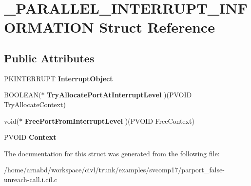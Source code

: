 \hypertarget{struct__PARALLEL__INTERRUPT__INFORMATION}{}\section{\+\_\+\+P\+A\+R\+A\+L\+L\+E\+L\+\_\+\+I\+N\+T\+E\+R\+R\+U\+P\+T\+\_\+\+I\+N\+F\+O\+R\+M\+A\+T\+I\+O\+N Struct Reference}
\label{struct__PARALLEL__INTERRUPT__INFORMATION}
\subsection*{Public Attributes}
\begin{DoxyCompactItemize}
\item 
\hypertarget{struct__PARALLEL__INTERRUPT__INFORMATION_a49384eb3eff37e54c1078d581a8caab1}{}P\+K\+I\+N\+T\+E\+R\+R\+U\+P\+T {\bfseries Interrupt\+Object}\label{struct__PARALLEL__INTERRUPT__INFORMATION_a49384eb3eff37e54c1078d581a8caab1}

\item 
\hypertarget{struct__PARALLEL__INTERRUPT__INFORMATION_a12bda228ea1ae3fba688dad1c16c6400}{}B\+O\+O\+L\+E\+A\+N($\ast$ {\bfseries Try\+Allocate\+Port\+At\+Interrupt\+Level} )(P\+V\+O\+I\+D Try\+Allocate\+Context)\label{struct__PARALLEL__INTERRUPT__INFORMATION_a12bda228ea1ae3fba688dad1c16c6400}

\item 
\hypertarget{struct__PARALLEL__INTERRUPT__INFORMATION_af8a76e8095468a2b8dcebe3a97a03867}{}void($\ast$ {\bfseries Free\+Port\+From\+Interrupt\+Level} )(P\+V\+O\+I\+D Free\+Context)\label{struct__PARALLEL__INTERRUPT__INFORMATION_af8a76e8095468a2b8dcebe3a97a03867}

\item 
\hypertarget{struct__PARALLEL__INTERRUPT__INFORMATION_a3346622111d4e406660efde2ebc03146}{}P\+V\+O\+I\+D {\bfseries Context}\label{struct__PARALLEL__INTERRUPT__INFORMATION_a3346622111d4e406660efde2ebc03146}

\end{DoxyCompactItemize}


The documentation for this struct was generated from the following file\+:\begin{DoxyCompactItemize}
\item 
/home/arnabd/workspace/civl/trunk/examples/svcomp17/parport\+\_\+false-\/unreach-\/call.\+i.\+cil.\+c\end{DoxyCompactItemize}
